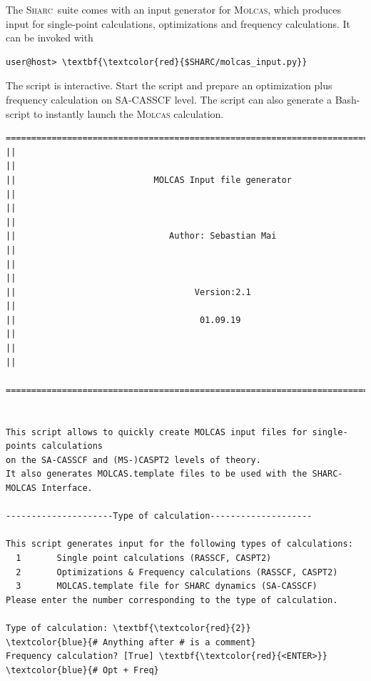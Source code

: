 \documentclass[a4paper,11pt,DIV=15,openany]{scrbook}
\newcommand{\sharc}{\textsc{Sharc}}
\begin{document}
The \sharc\ suite comes with an input generator for \textsc{Molcas}, which produces input for single-point calculations, optimizations and frequency calculations. 
It can be invoked with
\begin{Verbatim}[commandchars=\\\{\}]
user@host> \textbf{\textcolor{red}{$SHARC/molcas_input.py}}
\end{Verbatim}
The script is interactive. 
Start the script and prepare an optimization plus frequency calculation on SA-CASSCF level. 
The script can also generate a Bash-script to instantly launch the \textsc{Molcas} calculation.

\begin{oframed}
\footnotesize\begin{Verbatim}[commandchars=\\\{\}]
  ================================================================================
||                                                                                ||
||                           MOLCAS Input file generator                          ||
||                                                                                ||
||                              Author: Sebastian Mai                             ||
||                                                                                ||
||                                   Version:2.1                                  ||
||                                    01.09.19                                    ||
||                                                                                ||
  ================================================================================


This script allows to quickly create MOLCAS input files for single-points calculations
on the SA-CASSCF and (MS-)CASPT2 levels of theory. 
It also generates MOLCAS.template files to be used with the SHARC-MOLCAS Interface.
  
---------------------Type of calculation--------------------

This script generates input for the following types of calculations:
  1       Single point calculations (RASSCF, CASPT2)
  2       Optimizations & Frequency calculations (RASSCF, CASPT2)
  3       MOLCAS.template file for SHARC dynamics (SA-CASSCF)
Please enter the number corresponding to the type of calculation.

Type of calculation: \textbf{\textcolor{red}{2}}                       \textcolor{blue}{# Anything after # is a comment}
Frequency calculation? [True] \textbf{\textcolor{red}{<ENTER>}}        \textcolor{blue}{# Opt + Freq}


\end{Verbatim}
\end{oframed}
\end{document}
